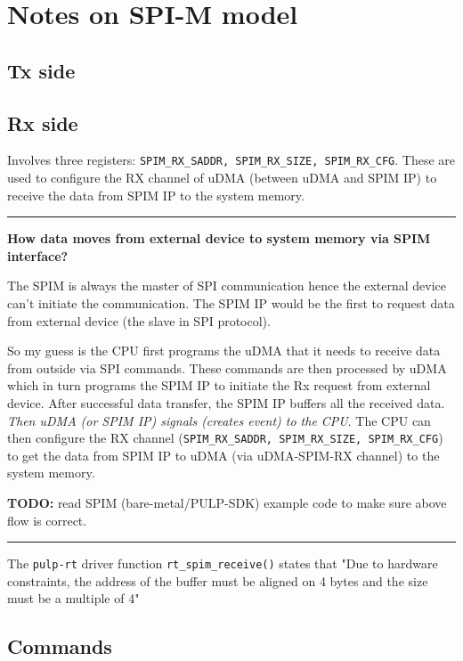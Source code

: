 \documentclass{article}
\begin{document}
\section{Notes on SPI-M model}
\subsection{Tx side}

\subsection{Rx side}
Involves three registers: \texttt{SPIM\_RX\_SADDR, SPIM\_RX\_SIZE, SPIM\_RX\_CFG}. These are used to configure the RX
channel of uDMA (between uDMA and SPIM IP) to receive the data from SPIM IP to the system memory.

\noindent \rule[0.5ex]{\linewidth}{1pt}

\noindent \textbf{How data moves from external device to system memory via SPIM interface?}

The SPIM is always the master of SPI communication hence the external device can't initiate the communication. The
SPIM IP would be the first to request data from external device (the slave in SPI protocol).

So my guess is the
CPU first programs the uDMA that it needs to receive data from outside via SPI commands. These commands are then
processed by uDMA which in turn programs the SPIM IP to initiate the Rx request from external device. After
successful data transfer, the SPIM IP buffers all the received data. \textit{Then uDMA (or SPIM IP)
 signals (creates event) to the CPU}.
The CPU can then configure the RX channel (\texttt{SPIM\_RX\_SADDR, SPIM\_RX\_SIZE, SPIM\_RX\_CFG})
to get the data from SPIM IP to uDMA (via uDMA-SPIM-RX channel) to the system memory.

\noindent \textbf{TODO:} read SPIM (bare-metal/PULP-SDK) example code to make sure above flow is correct.

\noindent \rule[0.5ex]{\linewidth}{1pt}

The \texttt{pulp-rt} driver function \texttt{rt\_spim\_receive()} states that "Due to hardware constraints, the address
of the buffer must be aligned on 4 bytes and the size must be a multiple of 4"

\subsection{Commands}
\end{document}
